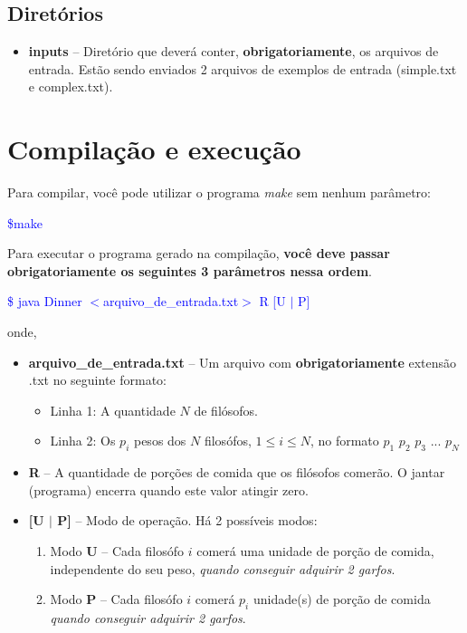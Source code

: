 \documentclass[11pt]{article}
\begin{document}
\subsection{Diretórios}
\begin{itemize}
	\item \textbf{inputs} -- Diretório que deverá conter, \textbf{obrigatoriamente}, os arquivos de entrada. Estão sendo enviados 2 arquivos de exemplos de entrada (simple.txt e complex.txt). 
\end{itemize}



\section{Compilação e execução}
Para compilar, você pode utilizar o programa \textit{make} sem nenhum parâmetro:

\begin{flushleft}
\textcolor{blue}{\$make}
\end{flushleft}

\noindent Para executar o programa gerado na compilação, \textbf{você deve passar obrigatoriamente os seguintes 3 parâmetros nessa ordem}.

\begin{flushleft}
\textcolor{blue}{\$ java Dinner $<$arquivo\_de\_entrada.txt$>$ R [U $|$ P]}

onde, 
\end{flushleft}
\begin{itemize}
\item \textbf{arquivo\_de\_entrada.txt} -- Um arquivo com \textbf{obrigatoriamente} extensão .txt no seguinte formato:
\begin{itemize}
	\item Linha 1: A quantidade $N$ de filósofos.
	\item Linha 2: Os $p_i$ pesos dos $N$ filosófos, $1 \leq i \leq N$, no formato $p_1$ $p_2$ $p_3$ ... $p_N$ 
\end{itemize} 
\item \textbf{R} -- A quantidade de porções de comida que os filósofos comerão. O jantar (programa) encerra quando este valor atingir zero.
\item \textbf{[U $|$ P]} -- Modo de operação. Há 2 possíveis modos:
\begin{enumerate}
	\item Modo \textbf{U} -- Cada filosófo $i$ comerá uma unidade de porção de comida, independente do seu peso, \textit{quando conseguir adquirir 2 garfos}.
	\item Modo \textbf{P} -- Cada filosófo $i$ comerá $p_i$ unidade(s) de porção de comida \textit{quando conseguir adquirir 2 garfos}.
\end{enumerate}
\end{itemize}
\end{document}
